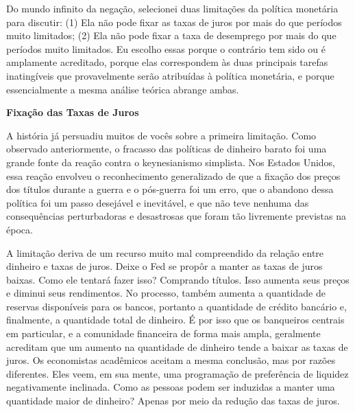 \documentclass[a4paper,12pt]{article}[abntex2]
\begin{document}
Do mundo infinito da negação, selecionei duas limitações da política monetária para discutir: (1) Ela não pode fixar as taxas de juros por mais do que períodos muito limitados; (2) Ela não pode fixar a taxa de desemprego por mais do que períodos muito limitados. Eu escolho essas porque o contrário tem sido ou é amplamente acreditado, porque elas correspondem às duas principais tarefas inatingíveis que provavelmente serão atribuídas à política monetária, e porque essencialmente a mesma análise teórica abrange ambas.

\textbf{Fixação das Taxas de Juros}

A história já persuadiu muitos de vocês sobre a primeira limitação. Como observado anteriormente, o fracasso das políticas de dinheiro barato foi uma grande fonte da reação contra o keynesianismo simplista. Nos Estados Unidos, essa reação envolveu o reconhecimento generalizado de que a fixação dos preços dos títulos durante a guerra e o pós-guerra foi um erro, que o abandono dessa política foi um passo desejável e inevitável, e que não teve nenhuma das consequências perturbadoras e desastrosas que foram tão livremente previstas na época.

A limitação deriva de um recurso muito mal compreendido da relação entre dinheiro e taxas de juros. Deixe o Fed se propôr a manter as taxas de juros baixas. Como ele tentará fazer isso? Comprando títulos. Isso aumenta seus preços e diminui seus rendimentos. No processo, também aumenta a quantidade de reservas disponíveis para os bancos, portanto a quantidade de crédito bancário e, finalmente, a quantidade total de dinheiro. É por isso que os banqueiros centrais em particular, e a comunidade financeira de forma mais ampla, geralmente acreditam que um aumento na quantidade de dinheiro tende a baixar as taxas de juros. Os economistas acadêmicos aceitam a mesma conclusão, mas por razões diferentes. Eles veem, em sua mente, uma programação de preferência de liquidez negativamente inclinada. Como as pessoas podem ser induzidas a manter uma quantidade maior de dinheiro? Apenas por meio da redução das taxas de juros.
\end{document}
